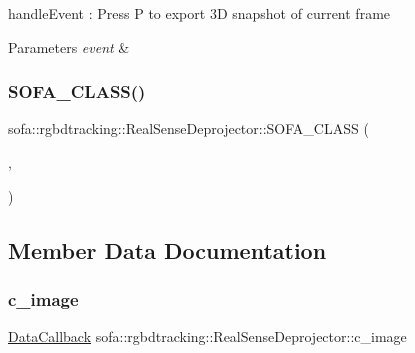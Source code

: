 handle\+Event \+: Press P to export 3D snapshot of current frame 


\begin{DoxyParams}{Parameters}
{\em event} & \\
\hline
\end{DoxyParams}
\mbox{\label{classsofa_1_1rgbdtracking_1_1_real_sense_deprojector_ab83880605bbf09764e64573381b5502c}} 
\subsubsection{\texorpdfstring{S\+O\+F\+A\+\_\+\+C\+L\+A\+S\+S()}{SOFA\_CLASS()}}
{\footnotesize\ttfamily sofa\+::rgbdtracking\+::\+Real\+Sense\+Deprojector\+::\+S\+O\+F\+A\+\_\+\+C\+L\+A\+SS (\begin{DoxyParamCaption}\item[{\hyperlink{classsofa_1_1rgbdtracking_1_1_real_sense_deprojector}{Real\+Sense\+Deprojector}}]{,  }\item[{\hyperlink{classsofa_1_1rgbdtracking_1_1_real_sense_abstract_deprojector_a9b4cae154f99cca58b05da9c4b0084ab}{Inherited}}]{ }\end{DoxyParamCaption})}



\subsection{Member Data Documentation}
\mbox{\label{classsofa_1_1rgbdtracking_1_1_real_sense_deprojector_a718873322b7771e3ddf7fa1da705ca6f}} 
\subsubsection{\texorpdfstring{c\+\_\+image}{c\_image}}
{\footnotesize\ttfamily \hyperlink{namespacesofa_1_1rgbdtracking_a00834a9204a667746fef9a402ccbfb55}{Data\+Callback} sofa\+::rgbdtracking\+::\+Real\+Sense\+Deprojector\+::c\+\_\+image}


